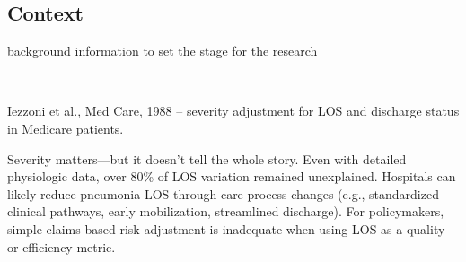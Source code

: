 \documentclass{article}
\begin{document}







\subsection{Context}

background information to set the stage for the research

----------------------------------------------------

    Iezzoni et al., Med Care, 1988 – severity adjustment for LOS and discharge status in Medicare patients.

    Severity matters—but it doesn’t tell the whole story. Even with detailed physiologic data, over 80\% of LOS variation remained unexplained. Hospitals can likely reduce pneumonia LOS through care-process changes (e.g., standardized clinical pathways, early mobilization, streamlined discharge). For policymakers, simple claims-based risk adjustment is inadequate when using LOS as a quality or efficiency metric.
\end{document}
